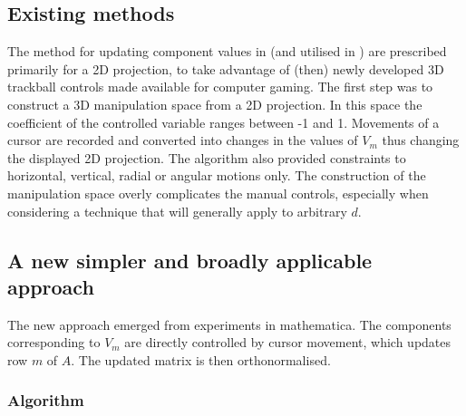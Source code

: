 \documentclass[]{interact}
\theoremstyle{plain}%
\theoremstyle{definition}
\theoremstyle{remark}
\begin{document}
\hypertarget{existing-methods}{%
\subsection{Existing methods}\label{existing-methods}}

The method for updating component values in \citet{cook_manual_1997}
(and utilised in \citet{spyrison_spinifex_2020}) are prescribed
primarily for a 2D projection, to take advantage of (then) newly
developed 3D trackball controls made available for computer gaming. The
first step was to construct a 3D manipulation space from a 2D
projection. In this space the coefficient of the controlled variable
ranges between -1 and 1. Movements of a cursor are recorded and
converted into changes in the values of \(V_m\) thus changing the
displayed 2D projection. The algorithm also provided constraints to
horizontal, vertical, radial or angular motions only. The construction
of the manipulation space overly complicates the manual controls,
especially when considering a technique that will generally apply to
arbitrary \(d\).

\hypertarget{a-new-simpler-and-broadly-applicable-approach}{%
\subsection{A new simpler and broadly applicable
approach}\label{a-new-simpler-and-broadly-applicable-approach}}

The new approach emerged from experiments in mathematica. The components
corresponding to \(V_m\) are directly controlled by cursor movement,
which updates row \(m\) of \(A\). The updated matrix is then
orthonormalised.

\hypertarget{algorithm}{%
\subsubsection{Algorithm}\label{algorithm}}
\end{document}
